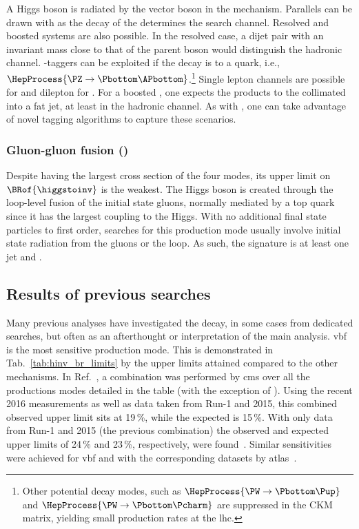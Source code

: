 A Higgs boson is radiated by the vector boson \PVec in the \VH mechanism. Parallels can be drawn with \ttH as the decay of the \PVec determines the search channel. Resolved and boosted systems are also possible. In the resolved case, a dijet pair with an invariant mass close to that of the parent boson would distinguish the hadronic channel. \Pbottom-taggers can be exploited if the decay is to a \Pbottom quark, i.e., $\HepProcess{\PZ \to \Pbottom\APbottom}$.\footnote{Other potential decay modes, such as $\HepProcess{\PW \to \Pbottom\Pup}$ and $\HepProcess{\PW \to \Pbottom\Pcharm}$ are suppressed in the CKM matrix, yielding small production rates at the \acrshort{lhc}.} Single lepton channels are possible for \WH and dilepton for \ZH. For a boosted \PVec, one expects the products to the collimated into a fat \gls{jet}, at least in the hadronic channel. As with \ttH, one can take advantage of novel tagging algorithms to capture these scenarios. 




\subsubsection{Gluon-gluon fusion (\texorpdfstring{\ggH}{ggH})}
\label{subsubsec:theory_hinv_ggF_mode}

Despite \ggH having the largest cross section of the four modes, its upper limit on $\BRof{\higgstoinv}$ is the weakest. The Higgs boson is created through the loop-level fusion of the initial state gluons, normally mediated by a top quark since it has the largest coupling to the Higgs. With no additional final state particles to first order, searches for this production mode usually involve initial state radiation from the gluons or the loop. As such, the signature is at least one \gls{jet} and \ptvecmiss.




\subsection{Results of previous searches}
\label{subsec:theory_hinv_prev_results}

Many previous analyses have investigated the \higgstoinv decay, in some cases from dedicated searches, but often as an afterthought or interpretation of the main analysis. \acrshort{vbf} is the most sensitive production mode. This is demonstrated in Tab.~\ref{tab:hinv_br_limits} by the upper limits attained compared to the other mechanisms. In Ref.~, a combination was performed by \acrshort{cms} over all the productions modes detailed in the table (with the exception of \ttH). Using the recent 2016 measurements as well as data taken from Run-1 and 2015, this combined observed upper limit sits at 19\,\%, while the expected is 15\,\%. With only data from Run-1 and 2015 (the previous combination) the observed and expected upper limits of 24\,\% and 23\,\%, respectively, were found~\cite{Khachatryan:2016whc}. Similar sensitivities were achieved for \acrshort{vbf} and \ttH with the corresponding datasets by \acrshort{atlas}~\cite{ATLAS:2020kdi}.

